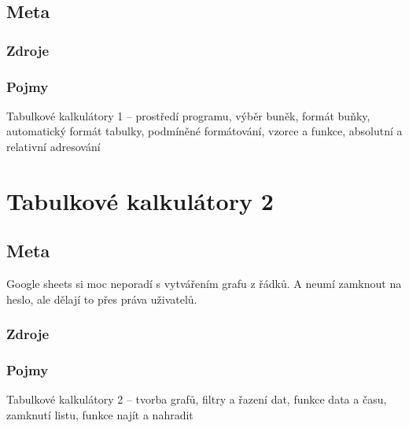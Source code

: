 \documentclass[12pt]{article}
\begin{document}
\subsection{Meta}
\subsubsection{Zdroje}
\subsubsection{Pojmy}
Tabulkové kalkulátory 1 – prostředí programu, výběr buněk, formát buňky, automatický formát tabulky, podmíněné formátování, vzorce a funkce, absolutní a relativní adresování

\section{Tabulkové kalkulátory 2}
\subsection{Meta}
Google sheets si moc neporadí s vytvářením grafu z řádků. A neumí zamknout na heslo, ale dělají to přes práva uživatelů.
\subsubsection{Zdroje}
\subsubsection{Pojmy}
Tabulkové kalkulátory 2 – tvorba grafů, filtry a řazení dat, funkce data a času, zamknutí listu, funkce najít a nahradit

\tableofcontents
\end{document}
